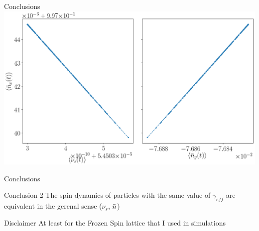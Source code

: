 \documentclass[14pt]{beamer}
\newcommand{\gef}{\gamma_{eff}}
\begin{document}
\begin{frame}{Conclusions}\centering
	\includegraphics[width=.9\linewidth]{decoh_sim/mean_n_bar_vs_spin_tune}
\end{frame}
\begin{frame}{Conclusions}
	\begin{block}{Conclusion 2}
		The spin dynamics of particles with the same value of $\gef$ are equivalent in the gerenal sense ($\nu_s$, $\bar n$)
	\end{block}
	\pause
	\begin{alertblock}{Disclaimer}
		At least for the Frozen Spin lattice that I used in simulations
	\end{alertblock}
\end{frame}
\end{document}
